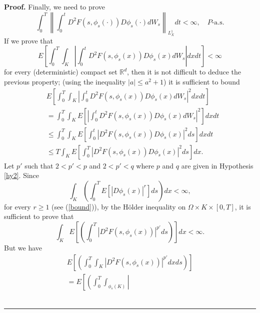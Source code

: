 \documentclass[a4paper,10pt]{article}
\newenvironment{proof}[1][Proof]{\textbf{#1.} }{\ \rule{0.5em}{0.5em}}
\begin{document}
\begin{proof}
Finally, we need to prove%
\[
\int_{0}^{T}\left\|  \int_{0}^{t}D^{2}F\left(  s,{\phi}_{s}\left(
\cdot\right)
\right)  D{\phi}_{s}\left(  \cdot\right)  dW_{s}\right\|  _{L_{X}^{1}}%
dt<\infty,\quad P\text{-a.s.}%
\]
If we prove that
\[
E\left[  \int_{0}^{T}\int_{K}\left|  \int_{0}^{t}D^{2}F\left(  s,{\phi}%
_{s}\left(  x\right)  \right)  D{\phi}_{s}\left(  x\right)  dW_{s}\right|
dxdt\right]  <\infty
\]
for every (deterministic) compact set $\mathbb{R} ^d$, then it is
not difficult to deduce the previous property;
(using the inequality $\left| a\right|  \leq a^{2}+1$) it is
sufficient to bound
\begin{align*}
&  E\left[  \int_{0}^{T}\int_{K}\left|  \int_{0}^{t}D^{2}F\left(  s,{\phi}%
_{s}\left(  x\right)  \right)  D{\phi}_{s}\left(  x\right)  dW_{s}\right|
^{2}dxdt\right] \\
&  =\int_{0}^{T}\int_{K}E\left[  \left| \int_{0}^{t}D^{2}F\left(
s,{\phi }_{s}\left(  x\right)  \right) D{\phi}_{s}\left(  x\right)
dW_{s}\right|
^{2}\right]  dxdt\\
&  \leq\int_{0}^{T}\int_{K}E\left[  \int_{0}^{t}\left|
D^{2}F\left(  s,{\phi }_{s}\left(  x\right)  \right)
D{\phi}_{s}\left(  x\right)  \right|
^{2}ds\right]  dxdt\\
&  \leq T\int_{K}E\left[  \int_{0}^{T}\left|  D^{2}F\left(  s,{\phi}%
_{s}\left(  x\right)  \right)  D{\phi}_{s}\left(  x\right)  \right|
^{2}ds\right]  dx.
\end{align*}
 Let $p'$ such that $2 < p' < p$ and $2< p' < q$ where $p$ and $q$ are given
 in Hypothesis \ref{hy2}. Since
\[
\int_{K}\left(  \int_{0}^{T}E\left[  \left|  D{\phi}_{s}\left(
x\right) \right|  ^{r}\right]  ds\right)  dx<\infty,
\]
for every $r \ge 1$ (see (\ref{bound})), by the H\"older
inequality on $\Omega \times K \times [0,T]$,  it is sufficient to
prove that
\[
\int_{K}E\left[  \left(  \int_{0}^{T}\left|  D^{2}F\left(
s,{\phi}_{s}\left( x\right)  \right)  \right| ^{p'}ds\right)
\right] dx<\infty.
\]
But
we have
\begin{align*}
E\left[  \left(  \int_{0}^{T}\int_{K}\left|  D^{2}F\left(
s,{\phi}_{s}\left( x\right)  \right)  \right| ^{p'}dxds\right)
\right]
\\
 =E\left[  \left( \int_{0}^{T}\int_{\phi_s (K)} \left|

\end{align*}
\end{proof}
\end{document}
